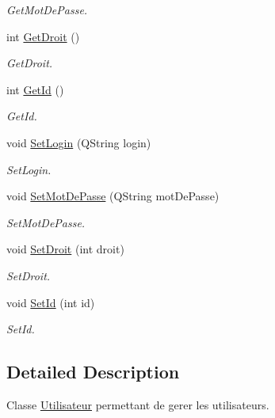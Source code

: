 \begin{DoxyCompactItemize}
\begin{DoxyCompactList}\small\item\em Get\+Mot\+De\+Passe. \end{DoxyCompactList}\item 
int \mbox{\hyperlink{class_utilisateur_aa5e86f36e1b94dc3cce6393205c0a8cf}{Get\+Droit}} ()
\begin{DoxyCompactList}\small\item\em Get\+Droit. \end{DoxyCompactList}\item 
int \mbox{\hyperlink{class_utilisateur_a6cb20ba5bcbb83792e31f8a913178534}{Get\+Id}} ()
\begin{DoxyCompactList}\small\item\em Get\+Id. \end{DoxyCompactList}\item 
void \mbox{\hyperlink{class_utilisateur_a0bf37c85322764c3b094acd66aacec64}{Set\+Login}} (Q\+String login)
\begin{DoxyCompactList}\small\item\em Set\+Login. \end{DoxyCompactList}\item 
void \mbox{\hyperlink{class_utilisateur_a64504a89dd26ab7529305ea8d98460e5}{Set\+Mot\+De\+Passe}} (Q\+String mot\+De\+Passe)
\begin{DoxyCompactList}\small\item\em Set\+Mot\+De\+Passe. \end{DoxyCompactList}\item 
void \mbox{\hyperlink{class_utilisateur_ab1d22e4a620262b9ea352b53872d855c}{Set\+Droit}} (int droit)
\begin{DoxyCompactList}\small\item\em Set\+Droit. \end{DoxyCompactList}\item 
void \mbox{\hyperlink{class_utilisateur_a583802b49a289114a47911a4ac98158d}{Set\+Id}} (int id)
\begin{DoxyCompactList}\small\item\em Set\+Id. \end{DoxyCompactList}\end{DoxyCompactItemize}


\subsection{Detailed Description}
Classe \mbox{\hyperlink{class_utilisateur}{Utilisateur}} permettant de gerer les utilisateurs. 

